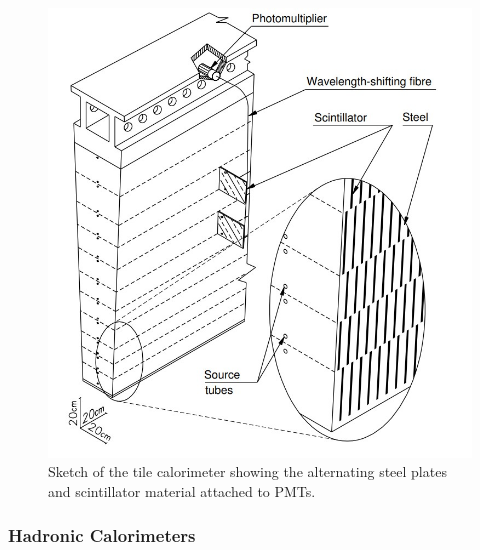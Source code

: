 \begin{figure}[H]
  \centering
  \includegraphics[scale=0.5]{figs/ch3/ecal_section.jpg}
  \caption{  Sketch of the tile calorimeter showing the alternating steel plates and scintillator material attached to PMTs. \cite{atlas}}
\label{fig:3.10}
\end{figure}

\subsubsection{Hadronic Calorimeters}

